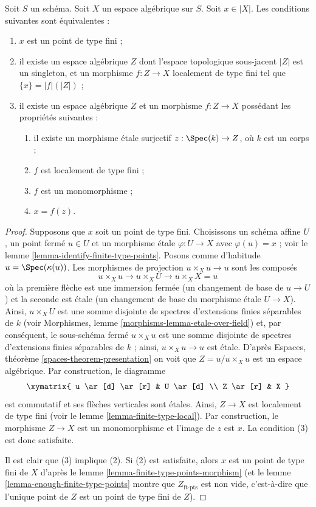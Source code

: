 \begin{lemma}
\label{lemma-point-finite-type-monomorphism}
Soit $S$ un schéma. Soit $X$ un espace algébrique sur $S$.
Soit $x \in |X|$. Les conditions suivantes sont équivalentes :
\begin{enumerate}
\item $x$ est un point de type fini ;
\item il existe un espace algébrique $Z$ dont l'espace topologique sous-jacent
$|Z|$ est un singleton, et un morphisme $f : Z \to X$ localement de type
fini tel que $\{x\} = |f|(|Z|)$ ;
\item il existe un espace algébrique $Z$ et un morphisme $f : Z \to X$
possédant les propriétés suivantes :
\begin{enumerate}
\item il existe un morphisme étale surjectif
$z : \Spec(k) \to Z$, où $k$ est un corps ;
\item $f$ est localement de type fini ;
\item $f$ est un monomorphisme ;
\item $x = f(z)$.
\end{enumerate}
\end{enumerate}
\end{lemma}

\begin{proof}
Supposons que $x$ soit un point de type fini. Choisissons un schéma affine $U$,
un point fermé $u \in U$ et un morphisme étale $\varphi : U \to X$
avec $\varphi(u) = x$ ; voir le
lemme \ref{lemma-identify-finite-type-points}.
Posons comme d'habitude $u = \Spec(\kappa(u))$. Les morphismes de projection
$u \times_X u \to u$ sont les composés
$$
u \times_X u \to u \times_X U \to u \times_X X = u
$$
où la première flèche est une immersion fermée (un changement de base de
$u \to U$) et la seconde est étale (un changement de base du morphisme étale
$U \to X$). Ainsi, $u \times_X U$ est une somme disjointe de spectres
d'extensions finies séparables de $k$ (voir
Morphismes, lemme \ref{morphisms-lemma-etale-over-field})
et, par conséquent, le sous-schéma fermé $u \times_X u$ est une somme disjointe de
spectres d'extensions finies séparables de $k$ ; ainsi, $u \times_X u \to u$ est étale. D'après
Espaces, théorème \ref{spaces-theorem-presentation}
on voit que $Z = u/u \times_X u$ est un espace algébrique. Par construction,
le diagramme
$$
\xymatrix{
u \ar[d] \ar[r] & U \ar[d] \\
Z \ar[r] & X
}
$$
est commutatif et ses flèches verticales sont étales. Ainsi, $Z \to X$ est localement
de type fini (voir le
lemme \ref{lemma-finite-type-local}).
Par construction, le morphisme $Z \to X$ est un monomorphisme et
l'image de $z$ est $x$. La condition (3) est donc satisfaite.

\medskip\noindent
Il est clair que (3) implique (2).
Si (2) est satisfaite, alors $x$ est un point de type fini de $X$ d'après le
lemme \ref{lemma-finite-type-points-morphism}
(et le
lemme \ref{lemma-enough-finite-type-points}
montre que $Z_{\text{ft-pts}}$ est non vide, c'est-à-dire que l'unique point de
$Z$ est un point de type fini de $Z$).
\end{proof}





